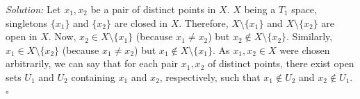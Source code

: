 
\emph{Solution:} Let $x_1,x_2$ be a pair of distinct points in $X$. $X$ being a $T_1$ space,
singletons $\{x_1\}$ and $\{x_2\}$ are closed in $X$. Therefore, $X\setminus\{x_1\}$ and
$X\setminus\{x_2\}$ are open in $X$. Now, $x_2\in X\setminus\{x_1\}$ (because $x_1\neq x_2$) but
$x_2\notin X\setminus\{x_2\}$. Similarly, $x_1\in X\setminus\{x_2\}$ (because $x_1\neq x_2$) but
$x_1\notin X\setminus\{x_1\}$. As $x_1,x_2\in X$ were chosen arbitrarily, we can say that for
each pair $x_1,x_2$ of distinct points, there exist open sets $U_1$ and $U_2$ containing $x_1$
and $x_2$, respectively, such that $x_1\notin U_2$ and $x_2\notin U_1$. \hfill$\square$
